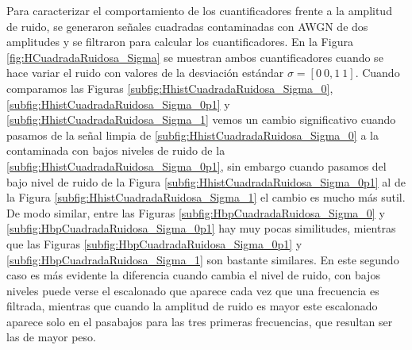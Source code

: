 Para caracterizar el comportamiento de los cuantificadores frente a la amplitud de ruido, se generaron señales cuadradas contaminadas con AWGN de dos amplitudes y se filtraron para calcular los cuantificadores.
En la Figura \ref{fig:HCuadradaRuidosa_Sigma} se muestran ambos cuantificadores cuando se hace variar el ruido con valores de la desviación estándar $\sigma=[0~0,1~1]$.
Cuando comparamos las Figuras \ref{subfig:HhistCuadradaRuidosa_Sigma_0}, \ref{subfig:HhistCuadradaRuidosa_Sigma_0p1} y \ref{subfig:HhistCuadradaRuidosa_Sigma_1} vemos un cambio significativo cuando pasamos de la señal limpia de \ref{subfig:HhistCuadradaRuidosa_Sigma_0} a la contaminada con bajos niveles de ruido de la \ref{subfig:HhistCuadradaRuidosa_Sigma_0p1}, sin embargo cuando pasamos del bajo nivel de ruido de la Figura \ref{subfig:HhistCuadradaRuidosa_Sigma_0p1} al de la Figura \ref{subfig:HhistCuadradaRuidosa_Sigma_1} el cambio es mucho más sutil.
De modo similar, entre las Figuras \ref{subfig:HbpCuadradaRuidosa_Sigma_0} y \ref{subfig:HbpCuadradaRuidosa_Sigma_0p1} hay muy pocas similitudes, mientras que las Figuras \ref{subfig:HbpCuadradaRuidosa_Sigma_0p1} y \ref{subfig:HbpCuadradaRuidosa_Sigma_1} son bastante similares.
En este segundo caso es más evidente la diferencia cuando cambia el nivel de ruido, con bajos niveles puede verse el escalonado que aparece cada vez que una frecuencia es filtrada, mientras que cuando la amplitud de ruido es mayor este escalonado aparece solo en el pasabajos para las tres primeras frecuencias, que resultan ser las de mayor peso.
%
